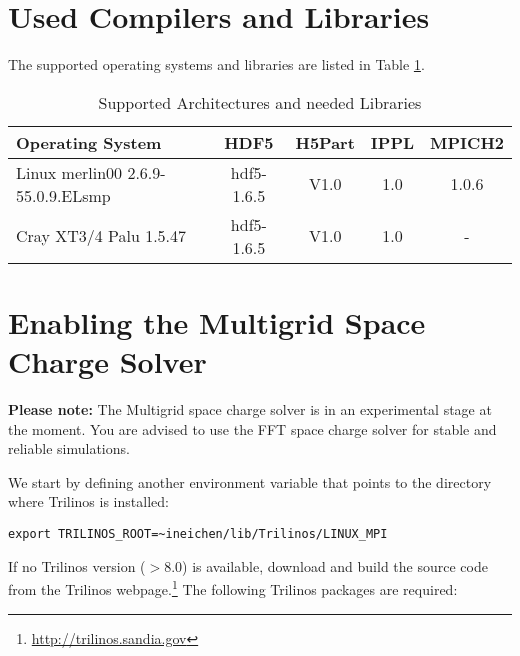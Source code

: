 \clearpage
\section{Used Compilers and Libraries}
The supported operating systems and libraries are listed in Table \ref{tab:archlib}.
\begin{table}[Ht] \footnotesize
  \begin{center}
    \caption{Supported Architectures and needed Libraries}
    \label{tab:archlib}
    \begin{tabular}{|lcccc|}
      \hline
      Operating System & HDF5  & H5Part & IPPL & MPICH2\\
      \hline
      Linux merlin00 2.6.9-55.0.9.ELsmp & hdf5-1.6.5 & V1.0 & 1.0 & 1.0.6 \\
      Cray XT3/4 Palu 1.5.47 & hdf5-1.6.5 & V1.0 & 1.0 & - \\
      \hline
    \end{tabular}
  \end{center}
\end{table}

\section{Enabling the Multigrid Space Charge Solver}

{\bf Please note:} The Multigrid space charge solver is in an experimental stage at the moment. You are advised to use the FFT space charge solver for stable and reliable simulations.

We start by defining another environment variable that points to the directory where Trilinos is installed:
\begin{footnotesize}
\begin{verbatim}
export TRILINOS_ROOT=~ineichen/lib/Trilinos/LINUX_MPI
\end{verbatim}
\end{footnotesize}
If no Trilinos version ($>$8.0) is available, download and build the source code from the Trilinos webpage.\footnote{\url{http://trilinos.sandia.gov}} The following Trilinos packages are required:

